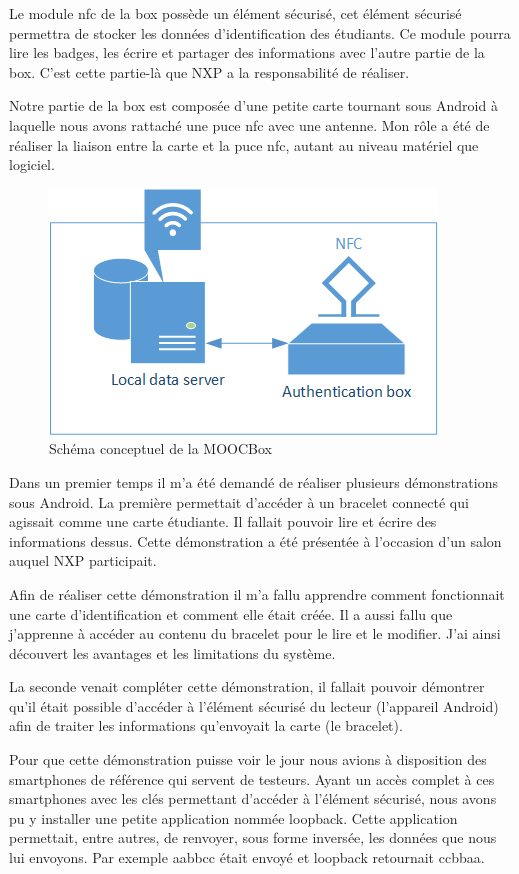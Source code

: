 \documentclass[french,12pt,a4paper,titlepage,openright,openbib]{report}
\begin{document}
Le module \gls{nfc} de la box possède un élément sécurisé, cet élément sécurisé permettra de stocker les données d'identification des étudiants. Ce module pourra lire les badges, les écrire et partager des informations avec l'autre partie de la box. C'est cette partie-là que NXP a la responsabilité de réaliser.

Notre partie de la box est composée d'une petite carte tournant sous Android à laquelle nous avons rattaché une puce \gls{nfc} avec une antenne. Mon rôle a été de réaliser la liaison entre la carte et la puce \gls{nfc}, autant au niveau matériel que logiciel.
\par
\begin{figure}
	\center
	\includegraphics[]{moocbox_mooctab}
	\caption{Schéma conceptuel de la MOOCBox}
\end{figure}
Dans un premier temps il m'a été demandé de réaliser plusieurs démonstrations sous Android.
La première permettait d'accéder à un bracelet connecté qui agissait comme une carte étudiante. Il fallait pouvoir lire et écrire des informations dessus. Cette démonstration a été présentée à l'occasion d'un salon auquel NXP participait.

Afin de réaliser cette démonstration il m'a fallu apprendre comment fonctionnait une carte d'identification et comment elle était créée. Il a aussi fallu que j'apprenne à accéder au contenu du bracelet pour le lire et le modifier. J'ai ainsi découvert les avantages et les limitations du système.

La seconde venait compléter cette démonstration, il fallait pouvoir démontrer qu'il était possible d'accéder à l'élément sécurisé du lecteur (l'appareil Android) afin de traiter les informations qu'envoyait la carte (le bracelet).

Pour que cette démonstration puisse voir le jour nous avions à disposition des smartphones de référence qui servent de testeurs. Ayant un accès complet à ces smartphones avec les clés permettant d'accéder à l'élément sécurisé, nous avons pu y installer une petite application nommée loopback. Cette application permettait, entre autres, de renvoyer, sous forme inversée, les données que nous lui envoyons. Par exemple aabbcc était envoyé et loopback retournait ccbbaa.
\end{document}
